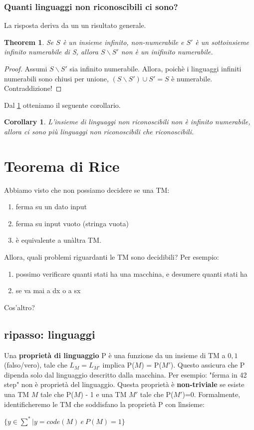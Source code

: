 \documentclass[a4paper, 12pt]{article}
\newtheorem{theorem}{Theorem}[section]
\newtheorem{corollary}{Corollary}[theorem]
\begin{document}
\subsubsection{Quanti linguaggi non riconoscibili ci sono?}
La risposta deriva da un  un risultato generale.
\begin{theorem}
\label{th:3}
Se $S$ \`e un insieme infinito, non-numerabile e $S'$ \`e un sottoinsieme infinito numerabile di S, allora $S \backslash S'$ non \`e un inifinito numerabile.
\end{theorem}
\begin{proof}
Assumi $S \backslash S'$ sia infinito numerabile. Allora, poich\`e i linguaggi infiniti numerabili sono chiusi per unione, $(S \backslash S') \cup S' = S$ \`e numerabile. Contraddizione!
\end{proof}
Dal \ref{th:3} otteniamo il seguente corollario.
\begin{corollary}
L'insieme di linguaggi non riconoscibili non \`e infinito numerabile, allora ci sono pi\`u linguaggi non riconoscibili che riconoscibili.
\end{corollary}


\section{Teorema di Rice}
Abbiamo visto che non possiamo decidere se una TM: \begin{enumerate}
\item ferma su un dato input
\item ferma su input vuoto (stringa vuota)
\item \`e equivalente a un\`altra TM.
\end{enumerate}
Allora, quali problemi riguardanti le TM sono decidibili?
Per esempio: \begin{enumerate}
\item possimo verificare quanti stati ha una macchina, e desumere quanti stati ha
\item se va mai a dx o a sx
\end{enumerate}
Cos'altro?
\subsection{ripasso: linguaggi}
Una \textbf{propriet\`a di linguaggio} P \`e una funzione da un insieme di TM a ${0,1}$ (falso/vero), tale che $L_M = L_{M'}$ implica P($M$) = P($M'$).
Questo assicura che P dipenda solo dal linguaggio descritto dalla macchina. Per esempio: "ferma in 42 step" non \`e propriet\`a del linguaggio.
Questa propriet\`a \`e \textbf{non-triviale} se esiste una TM $M$ tale che P($M$) - 1 e una TM $M'$ tale che P($M'$)=0. Formalmente, identificheremo le TM che soddisfano la propriet\`a P con l\`insieme: \begin{center}
$\{y \in \sum^* | y=code(M)\ e\ P(M)=1\}$
\end{center} 
\end{document}
